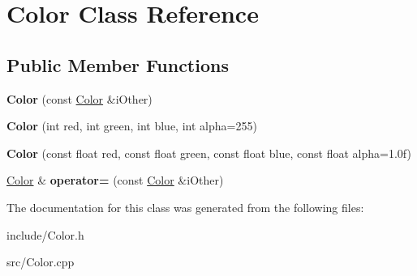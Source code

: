\hypertarget{classColor}{\section{Color Class Reference}
\label{classColor}
}
\subsection*{Public Member Functions}
\begin{DoxyCompactItemize}
\item 
\hypertarget{classColor_a8ab00b210e073f5927b81a94c7a07324}{{\bfseries Color} (const \hyperlink{classColor}{Color} \&i\-Other)}\label{classColor_a8ab00b210e073f5927b81a94c7a07324}

\item 
\hypertarget{classColor_a7e515720045da20ab9f16c5d0e0487e3}{{\bfseries Color} (int red, int green, int blue, int alpha=255)}\label{classColor_a7e515720045da20ab9f16c5d0e0487e3}

\item 
\hypertarget{classColor_ab47de2c4626ee3db857d8c19014adc0d}{{\bfseries Color} (const float red, const float green, const float blue, const float alpha=1.\-0f)}\label{classColor_ab47de2c4626ee3db857d8c19014adc0d}

\item 
\hypertarget{classColor_a5a82d6c9cc297a2f677436f644397a6c}{\hyperlink{classColor}{Color} \& {\bfseries operator=} (const \hyperlink{classColor}{Color} \&i\-Other)}\label{classColor_a5a82d6c9cc297a2f677436f644397a6c}

\end{DoxyCompactItemize}


The documentation for this class was generated from the following files\-:\begin{DoxyCompactItemize}
\item 
include/Color.\-h\item 
src/Color.\-cpp\end{DoxyCompactItemize}
